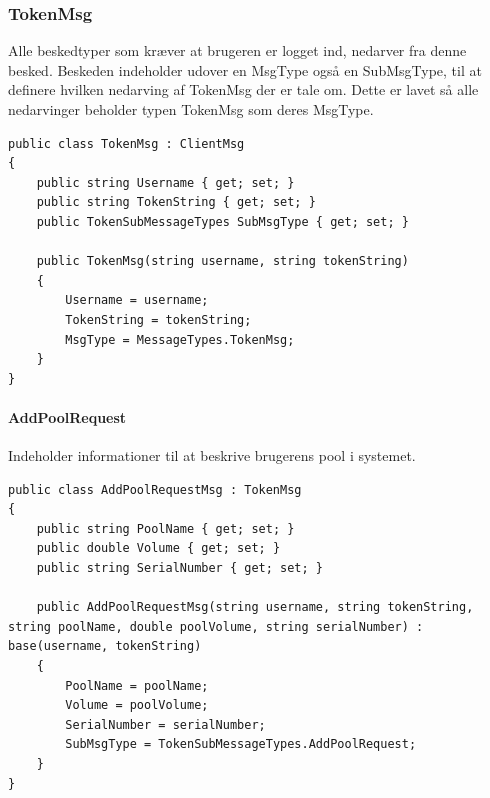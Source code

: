 \subsubsection{TokenMsg}
Alle beskedtyper som kræver at brugeren er logget ind, nedarver fra denne besked. Beskeden indeholder udover en MsgType også en SubMsgType, til at definere hvilken nedarving af TokenMsg der er tale om. Dette er lavet så alle nedarvinger beholder typen TokenMsg som deres MsgType.
\begin{lstlisting}[caption=TokenMsg, label=code:TokenMsg]
public class TokenMsg : ClientMsg
{
	public string Username { get; set; }
	public string TokenString { get; set; }
	public TokenSubMessageTypes SubMsgType { get; set; }
	
	public TokenMsg(string username, string tokenString)
	{
		Username = username;
		TokenString = tokenString;
		MsgType = MessageTypes.TokenMsg;
	}
}
\end{lstlisting}

\paragraph{AddPoolRequest}
Indeholder informationer til at beskrive brugerens pool i systemet.
\begin{lstlisting}[caption=AddPoolRequest, label=code:AddPoolRequest]
public class AddPoolRequestMsg : TokenMsg
{
	public string PoolName { get; set; }
	public double Volume { get; set; }
	public string SerialNumber { get; set; }
	
	public AddPoolRequestMsg(string username, string tokenString, string poolName, double poolVolume, string serialNumber) : base(username, tokenString)
	{
		PoolName = poolName;
		Volume = poolVolume;
		SerialNumber = serialNumber;
		SubMsgType = TokenSubMessageTypes.AddPoolRequest;
	}
}
\end{lstlisting}

